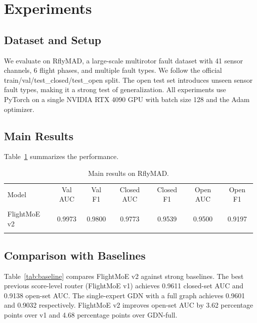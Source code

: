 \documentclass[letterpaper]{article}
\begin{document}
\section{Experiments}
\subsection{Dataset and Setup}
We evaluate on RflyMAD, a large-scale multirotor fault dataset with 41 sensor channels, 6 flight phases, and multiple fault types. We follow the official train/val/test\_closed/test\_open split. The open test set introduces unseen sensor fault types, making it a strong test of generalization. All experiments use PyTorch on a single NVIDIA RTX 4090 GPU with batch size 128 and the Adam optimizer.

\subsection{Main Results}
Table~\ref{tab:main} summarizes the performance.

\begin{table}[htbp]
\centering
\caption{Main results on RflyMAD.}
\label{tab:main}
\begin{tabular}{lcccccc}
\toprule
Model & Val AUC & Val F1 & Closed AUC & Closed F1 & Open AUC & Open F1 \\\\
\midrule
FlightMoE v2 &0.9973 &0.9800 &0.9773 &0.9539 &0.9500 &0.9197 \\\\
\bottomrule
\end{tabular}
\end{table}

\subsection{Comparison with Baselines}
Table~\ref{tab:baseline} compares FlightMoE v2 against strong baselines. The best previous score-level router (FlightMoE v1) achieves 0.9611 closed-set AUC and 0.9138 open-set AUC. The single-expert GDN with a full graph achieves 0.9601 and 0.9032 respectively. FlightMoE v2 improves open-set AUC by 3.62 percentage points over v1 and 4.68 percentage points over GDN-full.
\end{document}
